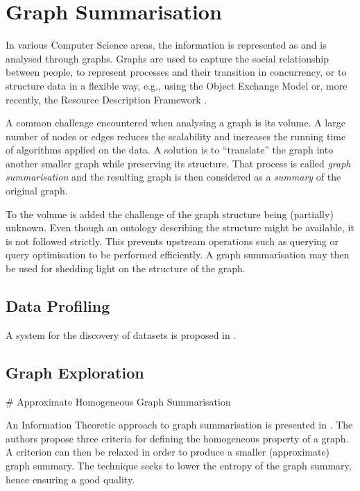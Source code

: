 \chapter{Graph Summarisation}
\label{chap:summary}

In various Computer Science areas, the information is represented as and is analysed through graphs. Graphs are used to capture the social relationship between people, to represent processes and their transition in concurrency, or to structure data in a flexible way, e.g., using the Object Exchange Model \cite{papakonstantinou:1995:oea} or, more recently, the Resource Description Framework \cite{rdfconcepts}.

A common challenge encountered when analysing a graph is its volume. A large number of nodes or edges reduces the scalability and increases the running time of algorithms applied on the data. A solution is to ``translate'' the graph into another smaller graph while preserving its structure. That process is called \emph{graph summarisation} and the resulting graph is then considered as a \emph{summary} of the original graph.

To the volume is added the challenge of the graph structure being (partially) unknown. Even though an ontology describing the structure might be available, it is not followed strictly. This prevents upstream operations such as querying or query optimisation to be performed efficiently. A graph summarisation may then be used for shedding light on the structure of the graph.

\section{Data Profiling}

A system for the discovery of datasets is proposed in \cite{khatchadourian:2010:eswc}.

\section{Graph Exploration}

\# Approximate Homogeneous Graph Summarisation

An Information Theoretic approach to graph summarisation is presented in \cite{zheng:ipsj:2011}. The authors propose three criteria for defining the homogeneous property of a graph. A criterion can then be relaxed in order to produce a smaller (approximate) graph summary. The technique seeks to lower the entropy of the graph summary, hence ensuring a good quality.

